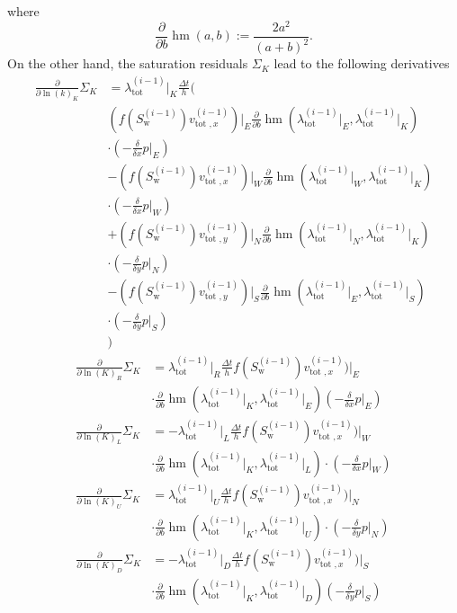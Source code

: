 \documentclass[twoside]{IEEEtran}
\newcommand*{\pdiff}[2]{\ensuremath{\frac{\partial}{\partial{#2}}{#1}}}
\newcommand*{\ddiff}[2]{\ensuremath{\frac{\delta}{\delta{#2}}{#1}}}
\DeclareMathOperator*{\hmean}{hm}
\begin{document}
where 
\begin{equation}
\pdiff{\hmean}{b}(a, b) := \frac{2a^2}{(a+b)^2}.
\end{equation}
On the other hand, the saturation residuals $\Sigma_K$ lead to the following derivatives
\begin{align}
\pdiff{\Sigma_K}{\ln(k)_K} &= \lambda_{\text{tot}}^{(i-1)}\lvert_K \frac{\Delta t}{h} \biggr(\\&(f(S_\text{w}^{(i-1)})v_{\text{tot }, x}^{(i-1)})\lvert_E\pdiff{\hmean}{b}(\lambda_\text{tot}^{(i-1)}\lvert_E, \lambda_\text{tot}^{(i-1)}\lvert_K) \nonumber\\&\cdot(-\ddiff{p}{x}\rvert_E)  \nonumber\\&- (f(S_\text{w}^{(i-1)})v_{\text{tot }, x}^{(i-1)})\lvert_W\pdiff{\hmean}{b}(\lambda_\text{tot}^{(i-1)}\lvert_W, \lambda_\text{tot}^{(i-1)}\lvert_K)\nonumber\\&\cdot(-\ddiff{p}{x}\rvert_W) \nonumber\\&+ (f(S_\text{w}^{(i-1)})v_{\text{tot }, y}^{(i-1)})\lvert_N\pdiff{\hmean}{b}(\lambda_\text{tot}^{(i-1)}\lvert_N, \lambda_\text{tot}^{(i-1)}\lvert_K)\nonumber\\&\cdot(-\ddiff{p}{y}\rvert_N)\nonumber\\&- (f(S_\text{w}^{(i-1)})v_{\text{tot }, y}^{(i-1)})\lvert_S\pdiff{\hmean}{b}(\lambda_\text{tot}^{(i-1)}\lvert_E, \lambda_\text{tot}^{(i-1)}\lvert_S)\nonumber\\&\cdot(-\ddiff{p}{y}\rvert_S)\nonumber\\&\biggr) \nonumber
\end{align}
\begin{align}
\pdiff{\Sigma_K}{\ln(K)_R} &= \lambda_{\text{tot}}^{(i-1)}\lvert_R \frac{\Delta t}{h} f(S_\text{w}^{(i-1)})v_{\text{tot }, x}^{(i-1)})\lvert_E\nonumber\\&\cdot\pdiff{\hmean}{b}(\lambda_\text{tot}^{(i-1)}\lvert_K, \lambda_\text{tot}^{(i-1)}\lvert_E)(-\ddiff{p}{x}\rvert_E)\\
\pdiff{\Sigma_K}{\ln(K)_L} &= -\lambda_{\text{tot}}^{(i-1)}\lvert_L\frac{\Delta t}{h} f(S_\text{w}^{(i-1)})v_{\text{tot }, x}^{(i-1)})\lvert_W\nonumber\\&\cdot\pdiff{\hmean}{b}(\lambda_\text{tot}^{(i-1)}\lvert_K, \lambda_\text{tot}^{(i-1)}\lvert_L)\cdot(-\ddiff{p}{x}\rvert_W)\\
\pdiff{\Sigma_K}{\ln(K)_U} &= \lambda_{\text{tot}}^{(i-1)}\lvert_U \frac{\Delta t}{h} f(S_\text{w}^{(i-1)})v_{\text{tot }, x}^{(i-1)})\lvert_N\nonumber\\&\cdot\pdiff{\hmean}{b}(\lambda_\text{tot}^{(i-1)}\lvert_K, \lambda_\text{tot}^{(i-1)}\lvert_U)\cdot(-\ddiff{p}{y}\rvert_N)\\
\pdiff{\Sigma_K}{\ln(K)_D} &= -\lambda_{\text{tot}}^{(i-1)}\lvert_D\frac{\Delta t}{h} f(S_\text{w}^{(i-1)})v_{\text{tot }, x}^{(i-1)})\lvert_S\nonumber\\&\cdot\pdiff{\hmean}{b}(\lambda_\text{tot}^{(i-1)}\lvert_K, \lambda_\text{tot}^{(i-1)}\lvert_D)(-\ddiff{p}{y}\rvert_S)
\end{align}





\end{document}
